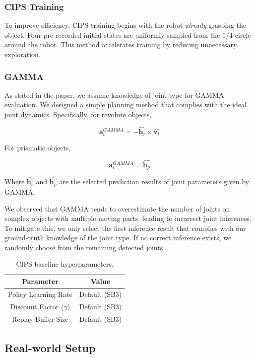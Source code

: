 \subsubsection{CIPS Training}
To improve efficiency, CIPS training begins with the robot \textit{already} grasping the object. Four pre-recorded initial states are uniformly sampled from the $1/4$ circle around the robot. This method accelerates training by reducing unnecessary exploration.
\subsubsection{GAMMA}
As stated in the paper, we assume knowledge of joint type for GAMMA evaluation. We designed a simple planning method that complies with the ideal joint dynamics. Specifically, for revolute objects, 

\[
\boldsymbol{a}_t^{GAMMA}=-\hat{\boldsymbol{h}_r} \times \hat{\boldsymbol{v}_t}
\]

For prismatic objects, 

\[
\boldsymbol{a}_t^{GAMMA}=
\hat{\boldsymbol{h}_p}
\]

Where $\hat{\boldsymbol{h}_r}$ and $\hat{\boldsymbol{h}_p}$ are the selected prediction results of joint parameters given by GAMMA.

We observed that GAMMA tends to overestimate the number of joints on complex objects with multiple moving parts, leading to incorrect joint inferences. To mitigate this, we only select the first inference result that complies with our ground-truth knowledge of the joint type. If no correct inference exists, we randomly choose from the remaining detected joints.

\begin{table}[t]
\centering
\begin{tabular}{cc}
\toprule
\textbf{Parameter} & \textbf{Value} \\
\midrule
Policy Learning Rate & Default (SB3) \\
Discount Factor (\(\gamma\)) & Default (SB3) \\
Replay Buffer Size & Default (SB3) \\
\bottomrule
\end{tabular}
\caption{CIPS baseline hyperparameters.}
\end{table}

\subsection{Real-world Setup}

